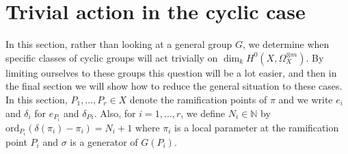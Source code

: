\documentclass[11pt]{article} %
\theoremstyle{remark}\newtheorem*{rem}{Remark}
\newcommand{\NN}{{\mathbb N}}
\begin{document}
  \section{Trivial action in the cyclic case}

   In this section, rather than looking at a general group $G$, we determine when specific classes of cyclic groups will act trivially on $\dim_kH^0(X,\Omega_X^{\otimes m})$.
   By limiting ourselves to these groups this question will be a lot easier, and then in the final section we will show how to reduce the general situation to these cases.\\

  In this section, $P_1,\ldots ,P_r \in X$ denote the ramification points of $\pi$ and we write $e_i$ and $\delta_i$ for $e_{P_i}$ and $\delta_P{_i}$.
  Also, for $i=1, \ldots, r$, we define $N_i \in \NN$ by $\textrm{ord}_{P_i}(\delta(\pi_i) - \pi_i) = N_i +1$ where $\pi_i$ is a local parameter at the ramification point $P_i$ and $\sigma$ is a generator of $G(P_i)$.\\ 
\end{document}
